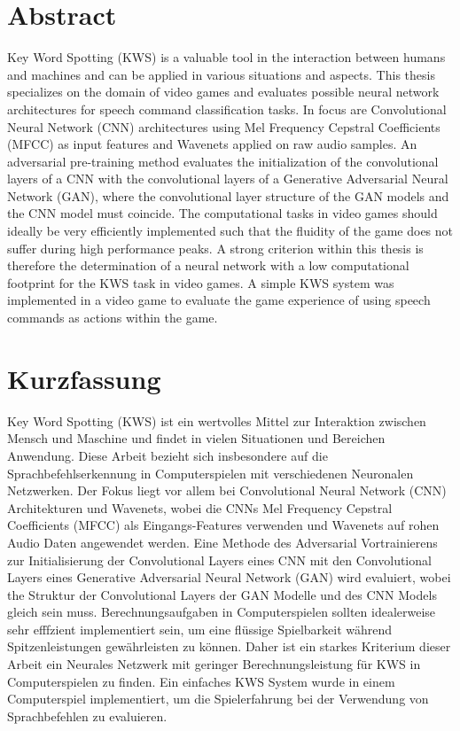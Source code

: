 
\chapter*{Abstract}\label{sec:shards_abstract}
Key Word Spotting (KWS) is a valuable tool in the interaction between humans and machines and can be applied in various situations and aspects.
This thesis specializes on the domain of video games and evaluates possible neural network architectures for speech command classification tasks.
In focus are Convolutional Neural Network (CNN) architectures using Mel Frequency Cepstral Coefficients (MFCC) as input features and Wavenets applied on raw audio samples.
An adversarial pre-training method evaluates the initialization of the convolutional layers of a CNN with the convolutional layers of a Generative Adversarial Neural Network (GAN), where the convolutional layer structure of the GAN models and the CNN model must coincide.
The computational tasks in video games should ideally be very efficiently implemented such that the fluidity of the game does not suffer during high performance peaks.
A strong criterion within this thesis is therefore the determination of a neural network with a low computational footprint for the KWS task in video games.
A simple KWS system was implemented in a video game to evaluate the game experience of using speech commands as actions within the game.



\chapter*{Kurzfassung}
Key Word Spotting (KWS) ist ein wertvolles Mittel zur Interaktion zwischen Mensch und Maschine und findet in vielen Situationen und Bereichen Anwendung.
Diese Arbeit bezieht sich insbesondere auf die Sprachbefehlserkennung in Computerspielen mit verschiedenen Neuronalen Netzwerken.
Der Fokus liegt vor allem bei Convolutional Neural Network (CNN) Architekturen und Wavenets, wobei die CNNs Mel Frequency Cepstral Coefficients (MFCC) als Eingangs-Features verwenden und Wavenets auf rohen Audio Daten angewendet werden.
Eine Methode des Adversarial Vortrainierens zur Initialisierung der Convolutional Layers eines CNN mit den Convolutional Layers eines Generative Adversarial Neural Network (GAN) wird evaluiert, wobei the Struktur der Convolutional Layers der GAN Modelle und des CNN Models gleich sein muss.
Berechnungsaufgaben in Computerspielen sollten idealerweise sehr efffzient implementiert sein, um eine flüssige Spielbarkeit während Spitzenleistungen gewährleisten zu können.
Daher ist ein starkes Kriterium dieser Arbeit ein Neurales Netzwerk mit geringer Berechnungsleistung für KWS in Computerspielen zu finden.
Ein einfaches KWS System wurde in einem Computerspiel implementiert, um die Spielerfahrung bei der Verwendung von Sprachbefehlen zu evaluieren.